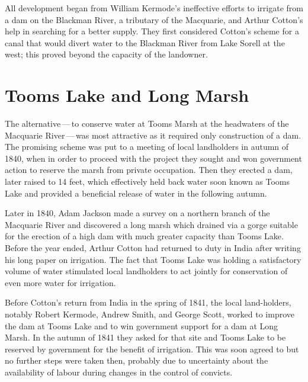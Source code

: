 All development began from William Kermode's
ineffective efforts to irrigate from a dam on
the Blackman River, a tributary of the Macquarie, and Arthur Cotton's
help in searching for a better supply.  They first considered Cotton's
scheme for a canal that would divert water to
the Blackman River from Lake
Sorell at the west; this proved beyond the capacity
of the landowner.

\section*{Tooms Lake and Long Marsh}

The alternative\,---\,to conserve water at Tooms Marsh at the
headwaters of the Macquarie River\,---\,was
most attractive as it required only construction of a
dam.  The promising scheme was put to a meeting
of local landholders in autumn of 1840, when in order to proceed with
the project they sought and won government action to reserve the marsh
from private occupation.  Then they erected a dam, later raised to 14
feet, which effectively held back water soon known as Tooms Lake and
provided a beneficial release of water in the following
autumn.

Later in 1840, Adam Jackson  made a survey on a
northern branch of the Macquarie River and discovered a long marsh
which drained via a gorge suitable for the erection of a high
dam with much greater capacity than Tooms Lake.
Before the year ended, Arthur Cotton  had returned
to duty in India after writing his long paper on irrigation.  The fact
that Tooms Lake was holding a satisfactory volume of water stimulated
local landholders to act jointly for conservation of even more water
for irrigation.

Before Cotton's return from India in the spring of 1841, the local
land-holders, notably Robert Kermode,  Andrew
Smith,  and George Scott,  worked to
improve the dam at Tooms Lake and to win
government support for a dam at Long Marsh.  In the autumn of 1841
they asked for that site and Tooms Lake to be reserved by government
for the benefit of irrigation.  This was soon agreed to but no further
steps were taken then, probably due to uncertainty about the
availability of labour during changes in the control of
convicts.

